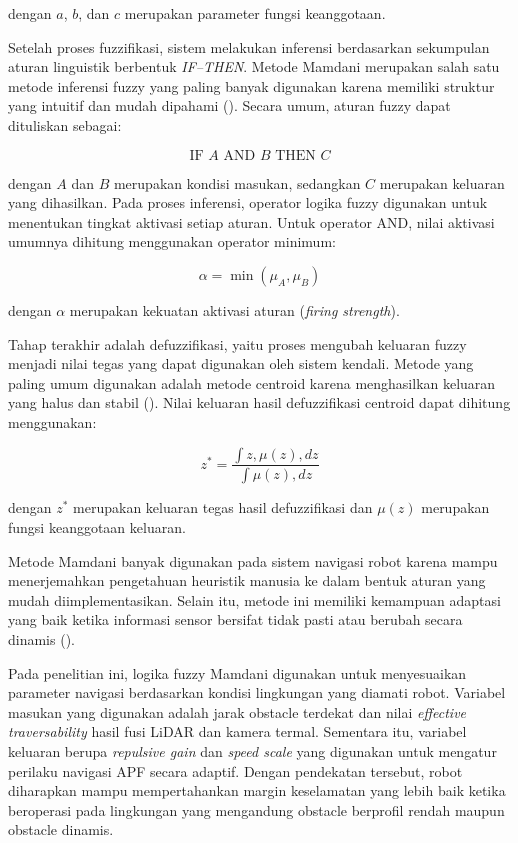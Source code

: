 dengan $a$, $b$, dan $c$ merupakan parameter fungsi keanggotaan.

Setelah proses fuzzifikasi, sistem melakukan inferensi berdasarkan sekumpulan aturan linguistik berbentuk \textit{IF--THEN}. Metode Mamdani merupakan salah satu metode inferensi fuzzy yang paling banyak digunakan karena memiliki struktur yang intuitif dan mudah dipahami (\cite{Mamdani1975}). Secara umum, aturan fuzzy dapat dituliskan sebagai:

\begin{equation}
\text{IF } A \text{ AND } B \text{ THEN } C
\label{eq:fuzzy_rule}
\end{equation}

dengan $A$ dan $B$ merupakan kondisi masukan, sedangkan $C$ merupakan keluaran yang dihasilkan. Pada proses inferensi, operator logika fuzzy digunakan untuk menentukan tingkat aktivasi setiap aturan. Untuk operator AND, nilai aktivasi umumnya dihitung menggunakan operator minimum:

\begin{equation}
\alpha = \min(\mu_A,\mu_B)
\label{eq:min_operator}
\end{equation}

dengan $\alpha$ merupakan kekuatan aktivasi aturan (\textit{firing strength}).

Tahap terakhir adalah defuzzifikasi, yaitu proses mengubah keluaran fuzzy menjadi nilai tegas yang dapat digunakan oleh sistem kendali. Metode yang paling umum digunakan adalah metode centroid karena menghasilkan keluaran yang halus dan stabil (\cite{Ross2010}). Nilai keluaran hasil defuzzifikasi centroid dapat dihitung menggunakan:

\begin{equation}
z^*=
\frac{
\int z , \mu(z), dz
}{
\int \mu(z), dz
}
\label{eq:centroid}
\end{equation}

dengan $z^*$ merupakan keluaran tegas hasil defuzzifikasi dan $\mu(z)$ merupakan fungsi keanggotaan keluaran.

Metode Mamdani banyak digunakan pada sistem navigasi robot karena mampu menerjemahkan pengetahuan heuristik manusia ke dalam bentuk aturan yang mudah diimplementasikan. Selain itu, metode ini memiliki kemampuan adaptasi yang baik ketika informasi sensor bersifat tidak pasti atau berubah secara dinamis (\cite{Benaicha2026,Masehian2010}).

Pada penelitian ini, logika fuzzy Mamdani digunakan untuk menyesuaikan parameter navigasi berdasarkan kondisi lingkungan yang diamati robot. Variabel masukan yang digunakan adalah jarak obstacle terdekat dan nilai \textit{effective traversability} hasil fusi LiDAR dan kamera termal. Sementara itu, variabel keluaran berupa \textit{repulsive gain} dan \textit{speed scale} yang digunakan untuk mengatur perilaku navigasi APF secara adaptif. Dengan pendekatan tersebut, robot diharapkan mampu mempertahankan margin keselamatan yang lebih baik ketika beroperasi pada lingkungan yang mengandung obstacle berprofil rendah maupun obstacle dinamis.


